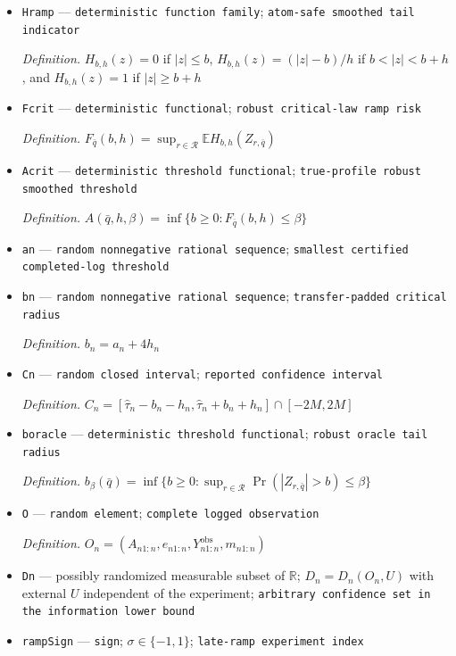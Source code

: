 \documentclass{article}
\begin{document}
\begin{itemize}
  \item \texttt{Hramp} --- \texttt{deterministic function family}; \texttt{atom-\allowbreak{}safe smoothed tail indicator}
  \par\smallskip\noindent\emph{Definition.} \(H_{b,h}(z)=0\) if \(|z|\le b\), \(H_{b,h}(z)=(|z|-b)/h\) if \(b<|z|<b+h\), and \(H_{b,h}(z)=1\) if \(|z|\ge b+h\)
  \item \texttt{Fcrit} --- \texttt{deterministic functional}; \texttt{robust critical-\allowbreak{}law ramp risk}
  \par\smallskip\noindent\emph{Definition.} \(F_{\bar q}(b,h)=\sup_{r\in\mathcal R}\mathbb E H_{b,h}(Z_{r,\bar q})\)
  \item \texttt{Acrit} --- \texttt{deterministic threshold functional}; \texttt{true-\allowbreak{}profile robust smoothed threshold}
  \par\smallskip\noindent\emph{Definition.} \(A(\bar q,h,\beta)=\inf\{b\ge0:F_{\bar q}(b,h)\le\beta\}\)
  \item \texttt{an} --- \texttt{random nonnegative rational sequence}; \texttt{smallest certified completed-\allowbreak{}log threshold}
  \item \texttt{bn} --- \texttt{random nonnegative rational sequence}; \texttt{transfer-\allowbreak{}padded critical radius}
  \par\smallskip\noindent\emph{Definition.} \(b_n=a_n+4h_n\)
  \item \texttt{Cn} --- \texttt{random closed interval}; \texttt{reported confidence interval}
  \par\smallskip\noindent\emph{Definition.} \(C_n=[\widehat\tau_n-b_n-h_n,\widehat\tau_n+b_n+h_n]\cap[-2M,2M]\)
  \item \texttt{boracle} --- \texttt{deterministic threshold functional}; \texttt{robust oracle tail radius}
  \par\smallskip\noindent\emph{Definition.} \(b_{\beta}(\bar q)=\inf\{b\ge0:\sup_{r\in\mathcal R}\Pr(|Z_{r,\bar q}|>b)\le\beta\}\)
  \item \texttt{O} --- \texttt{random element}; \texttt{complete logged observation}
  \par\smallskip\noindent\emph{Definition.} \(O_n=(A_{n1:n},e_{n1:n},Y_{n1:n}^{\mathrm{obs}},m_{n1:n})\)
  \item \texttt{Dn} --- possibly randomized measurable subset of \(\mathbb R\); \(D_n=D_n(O_n,U)\) with external \(U\) independent of the experiment; \texttt{arbitrary confidence set in the information lower bound}
  \item \texttt{rampSign} --- \texttt{sign}; \(\sigma\in\{-1,1\}\); \texttt{late-\allowbreak{}ramp experiment index}

\end{itemize}
\end{document}
